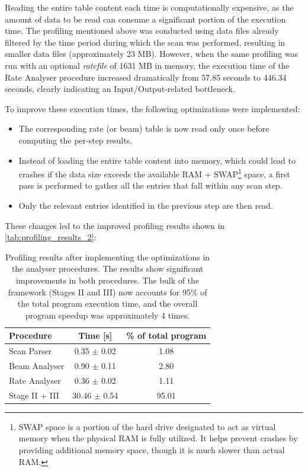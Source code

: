 Reading the entire table content each time is computationally expensive, as the amount of data to be read can consume a significant portion of the execution time. The profiling mentioned above was conducted using data files already filtered by the time period during which the scan was performed, resulting in smaller data files (approximately 23 MB). However, when the same profiling was run with an optional \textit{ratefile} of 1631 MB in memory, the execution time of the Rate Analyser procedure increased dramatically from 57.85 seconds to 446.34 seconds, clearly indicating an Input/Output-related bottleneck.

To improve these execution times, the following optimizations were implemented:

\begin{itemize}
	\item The corresponding rate (or beam) table is now read only once before computing the per-step results.
	\item Instead of loading the entire table content into memory, which could lead to crashes if the data size exceeds the available RAM + SWAP\footnote{SWAP space is a portion of the hard drive designated to act as virtual memory when the physical RAM is fully utilized. It helps prevent crashes by providing additional memory space, though it is much slower than actual RAM.} space, a first pass is performed to gather all the entries that fall within any scan step.
	\item Only the relevant entries identified in the previous step are then read.
\end{itemize}

These changes led to the improved profiling results shown in \autoref{tab:profiling_results_2}:

\begin{table}[!htb]
	\centering
	\caption{Profiling results after implementing the optimizations in the analyser procedures. The results show significant improvements in both procedures. The bulk of the framework (Stages II and III) now accounts for 95\% of the total program execution time, and the overall program speedup was approximately 4 times.}
	\begin{tabular}{|l|c|c|}
		\hline
		\textbf{Procedure} & \textbf{Time [s]} & \textbf{\% of total program} \\
		\hline
		Scan Parser        & 0.35 $\pm$ 0.02   & 1.08                         \\
		Beam Analyser      & 0.90 $\pm$ 0.11   & 2.80                         \\
		Rate Analyser      & 0.36 $\pm$ 0.02   & 1.11                         \\
		Stage II + III     & 30.46 $\pm$ 0.54  & 95.01                        \\
		\hline
	\end{tabular}
	\label{tab:profiling_results_2}
\end{table}

